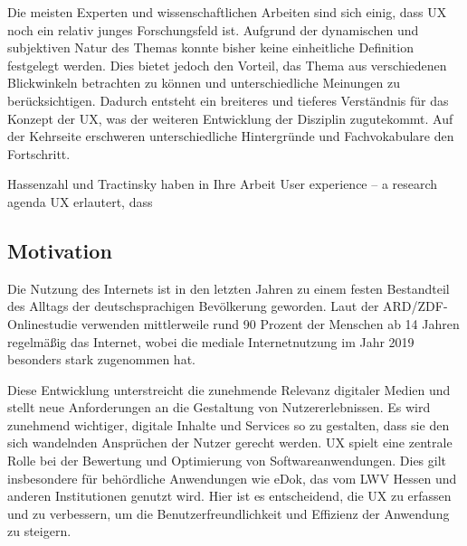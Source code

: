 \documentclass[12pt,oneside]{article}
\begin{document}
Die meisten Experten und wissenschaftlichen Arbeiten sind sich einig, dass UX noch ein relativ junges Forschungsfeld ist. Aufgrund der dynamischen und subjektiven Natur des Themas konnte bisher keine einheitliche Definition festgelegt werden. Dies bietet jedoch den Vorteil, das Thema aus verschiedenen Blickwinkeln betrachten zu können und unterschiedliche Meinungen zu berücksichtigen. Dadurch entsteht ein breiteres und tieferes Verständnis für das Konzept der UX, was der weiteren Entwicklung der Disziplin zugutekommt.\newline
Auf der Kehrseite erschweren unterschiedliche Hintergründe und Fachvokabulare den Fortschritt.\cite{glanznig}
 

Hassenzahl und Tractinsky haben in Ihre Arbeit User experience – a research agenda UX  erlautert, dass \cite{research}\newline




\subsection{Motivation}

Die Nutzung des Internets ist in den letzten Jahren zu einem festen Bestandteil des Alltags der deutschsprachigen Bevölkerung geworden. Laut der ARD/ZDF-Onlinestudie \cite{ard} verwenden mittlerweile rund 90 Prozent der Menschen ab 14 Jahren regelmäßig das Internet, wobei die mediale Internetnutzung im Jahr 2019 besonders stark zugenommen hat.

Diese Entwicklung unterstreicht die zunehmende Relevanz digitaler Medien und stellt neue Anforderungen an die Gestaltung von Nutzererlebnissen. Es wird zunehmend wichtiger, digitale Inhalte und Services so zu gestalten, dass sie den sich wandelnden Ansprüchen der Nutzer gerecht werden. UX spielt eine zentrale Rolle bei der Bewertung und Optimierung von Softwareanwendungen. Dies gilt insbesondere für behördliche Anwendungen wie eDok, das vom LWV Hessen und anderen Institutionen genutzt wird. Hier ist es entscheidend, die UX zu erfassen und zu verbessern, um die Benutzerfreundlichkeit und Effizienz der Anwendung zu steigern.
\end{document}
